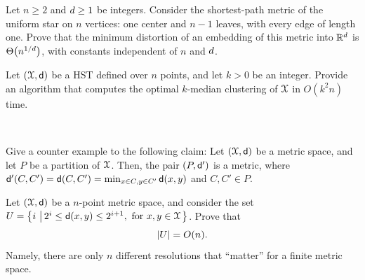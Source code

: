 \begin{exercise}
    Let $n \geq 2$ and $d \geq 1$ be integers. Consider the
    shortest-path metric of the uniform star on $n$ vertices: one
    center and $n-1$ leaves, with every edge of length one. Prove that
    the minimum distortion of an embedding of this metric into
    $\mathbb{R}^d$ is $\Theta\pth{n^{1/\hdim}}$, with constants
    independent of $n$ and $d$.

\end{exercise}

\begin{exercise}
    Let $(\FMS,\DistChar)$ be a HST defined over $n$ points, and let $k >
    0$ be an integer. Provide an algorithm that computes the optimal
    $k$-median clustering of $\FMS$ in $O(k^2 n )$ time.
    
\end{exercise}


\begin{exercise} ~

    \begin{compactenuma}
        \item Give a counter example to the following claim: Let
        $(\FMS,\DistChar)$ be a metric space, and let $P$ be a
        partition of $\FMS$. Then, the pair $(P,\mathsf{d}')$ is a
        metric, where
        $\mathsf{d}'(C, C') = \mathsf{d}(C, C')=\min_{x \in C, y \in C'}
        \mathsf{d}(x,y)$ and $C, C' \in P$.
        
        \item Let $(\FMS,\DistChar)$ be a $n$-point metric space, and
        consider the set
        $U = \brc{ i \sep{ 2^i \leq \DistChar(x,y) \leq 2^{i+1},
              \text{ for } x,y \in \FMS}}$. Prove that
        \[
        \left| {U} \right| = O(n).
        \]
        Namely, there are only $n$ different
        resolutions that ``matter'' for a finite metric space.
    \end{compactenuma}
\end{exercise}


